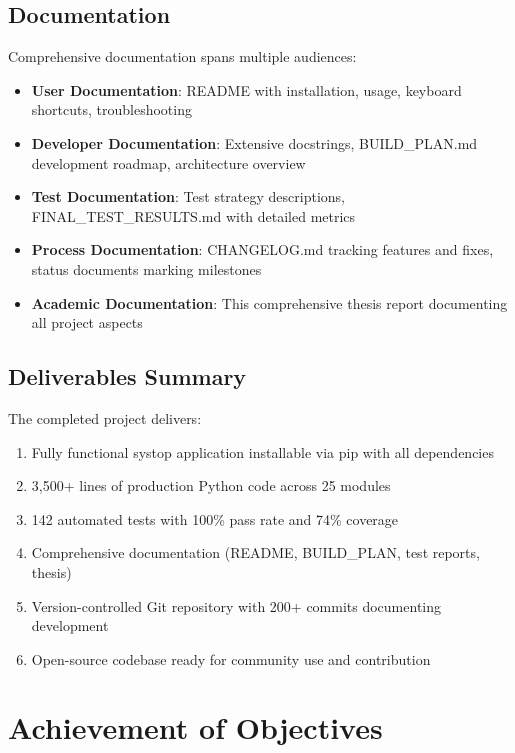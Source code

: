 \documentclass[12pt,a4paper,oneside]{report}
\begin{document}
\subsection{Documentation}

Comprehensive documentation spans multiple audiences:

\begin{itemize}
    \item \textbf{User Documentation}: README with installation, usage, keyboard shortcuts, troubleshooting
    \item \textbf{Developer Documentation}: Extensive docstrings, BUILD\_PLAN.md development roadmap, architecture overview
    \item \textbf{Test Documentation}: Test strategy descriptions, FINAL\_TEST\_RESULTS.md with detailed metrics
    \item \textbf{Process Documentation}: CHANGELOG.md tracking features and fixes, status documents marking milestones
    \item \textbf{Academic Documentation}: This comprehensive thesis report documenting all project aspects
\end{itemize}

\subsection{Deliverables Summary}

The completed project delivers:

\begin{enumerate}
    \item Fully functional systop application installable via pip with all dependencies
    \item 3,500+ lines of production Python code across 25 modules
    \item 142 automated tests with 100\% pass rate and 74\% coverage
    \item Comprehensive documentation (README, BUILD\_PLAN, test reports, thesis)
    \item Version-controlled Git repository with 200+ commits documenting development
    \item Open-source codebase ready for community use and contribution
\end{enumerate}

\section{Achievement of Objectives}
\label{sec:objectives-achievement}
\end{document}

